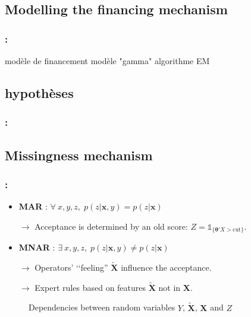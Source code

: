\documentclass[english,xcolor={rgb,dvipsnames,table,usenames}]{beamer}
\begin{document}
\subsection{Modelling the financing mechanism}

\begin{frame}
\frametitle{\secname : \subsecname}

modèle de financement
modèle "gamma"
algorithme EM

\end{frame}




\subsection{hypothèses}

\begin{frame}
\frametitle{\secname : \subsecname}


\end{frame}


\subsection*{Missingness mechanism}

\begin{frame}
\frametitle{\secname : \subsecname}

\begin{itemize}
\item \textbf{MAR} : $\forall \: x,y,z, \; p(z| \bm{x},y) = p(z| \bm{x})$

$\rightarrow$ Acceptance is determined by an old score: $Z = \mathds{1}_{\{\bm{\theta}'X > \text{cut}\}}$.

\item \textbf{MNAR} : $\exists \: x,y,z, \; p(z| \bm{x},y) \neq p(z| \bm{x})$

$\rightarrow$ Operators' ‘‘feeling'' $\tilde{\bm{X}}$ influence the acceptance.

$\rightarrow$ Expert rules based on features $\tilde{\bm{X}}$ not in $\bm{X}$.
\end{itemize}

\begin{figure}
\label{fig:mar}
\caption{Dependencies between random variables $Y$, $\bm{\tilde{X}}$, $\bm{X}$ and $Z$}
\end{figure}

\end{frame}
\end{document}
